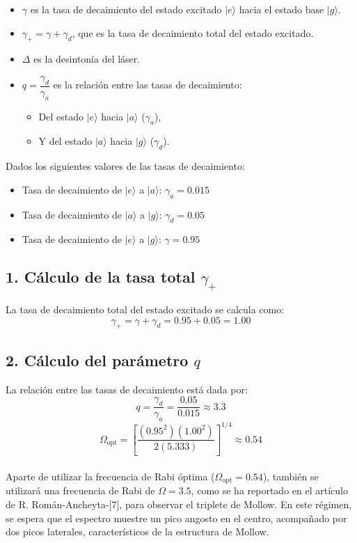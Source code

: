 \documentclass[12pt]{report}
\begin{document}
\begin{itemize}
    \item $\gamma$ es la tasa de decaimiento del estado excitado $|e\rangle$ hacia el estado base $|g\rangle$.

    \item $\gamma_+ = \gamma + \gamma_d$, que es la tasa de decaimiento total del estado excitado.

    \item $\Delta$ es la desintonía del láser.

    \item $q = \dfrac{\gamma_d}{\gamma_a}$ es la relación entre las tasas de decaimiento:
        \begin{itemize}
            \item Del estado $|e\rangle$ hacia $|a\rangle$ ($\gamma_a$),
            \item Y del estado $|a\rangle$ hacia $|g\rangle$ ($\gamma_d$).
        \end{itemize}
\end{itemize}

Dados los siguientes valores de las tasas de decaimiento:
\begin{itemize}
    \item Tasa de decaimiento de $|e\rangle$ a $|a\rangle$: $\gamma_a = 0.015$
    \item Tasa de decaimiento de $|a\rangle$ a $|g\rangle$: $\gamma_d = 0.05$
    \item Tasa de decaimiento de $|e\rangle$ a $|g\rangle$: $\gamma = 0.95$
\end{itemize}

\subsection*{1. Cálculo de la tasa total $\gamma_+$}
La tasa de decaimiento total del estado excitado se calcula como:
\[
\gamma_+ = \gamma + \gamma_d = 0.95 + 0.05 = \boxed{1.00}
\]

\subsection*{2. Cálculo del parámetro $q$}
La relación entre las tasas de decaimiento está dada por:
\[
q = \frac{\gamma_d}{\gamma_a} = \frac{0.05}{0.015} \approx \boxed{3.\overline{3}}
\]
\[
\Omega_{\text{opt}} = \left[ \frac{(0.95^2)(1.00^2)}{2(5.333)} \right]^{1/4} \approx 0.54
\]
\\
Aparte de utilizar la frecuencia de Rabi óptima ($\Omega_{\text{opt}} = 0.54$), también se utilizará una frecuencia de Rabi de $\Omega = 3.5$, como se ha reportado en el artículo de R. Román-Ancheyta-[7], para observar el triplete de Mollow. En este régimen, se espera que el espectro muestre un pico angosto en el centro, acompañado por dos picos laterales, característicos de la estructura de Mollow.
\end{document}
